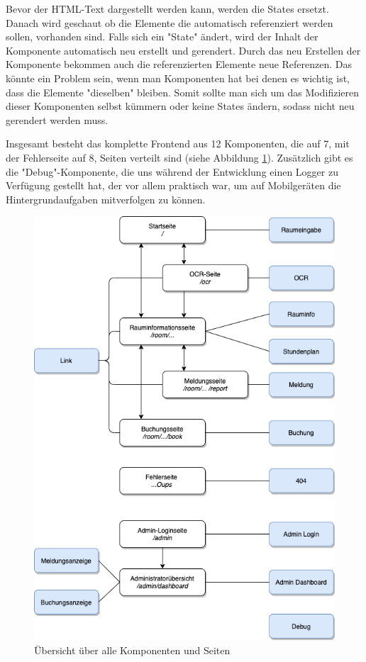 Bevor der HTML-Text dargestellt werden kann, werden die States ersetzt. Danach wird geschaut ob die Elemente die automatisch referenziert werden sollen, vorhanden sind. Falls sich ein "State" ändert, wird der Inhalt der Komponente automatisch neu erstellt und gerendert. Durch das neu Erstellen der Komponente bekommen auch die referenzierten Elemente neue Referenzen. Das könnte ein Problem sein, wenn man Komponenten hat bei denen es wichtig ist, dass die Elemente "dieselben" bleiben. Somit sollte man sich um das Modifizieren dieser Komponenten selbst kümmern oder keine States ändern, sodass nicht neu gerendert werden muss.


Insgesamt besteht das komplette Frontend aus 12 Komponenten, die auf 7, mit der Fehlerseite auf 8, Seiten verteilt sind (siehe Abbildung \ref{fig:comppageoverview}). Zusätzlich gibt es die "Debug"-Komponente, die uns während der Entwicklung einen Logger zu Verfügung gestellt hat, der vor allem praktisch war, um auf Mobilgeräten die Hintergrundaufgaben mitverfolgen zu können.

\begin{figure}[H]
    \centering
    \includegraphics[width=150mm]{media/WebComponents/overview.png} %
    \caption{Übersicht über alle Komponenten und Seiten}
    \label{fig:comppageoverview}
\end{figure}

